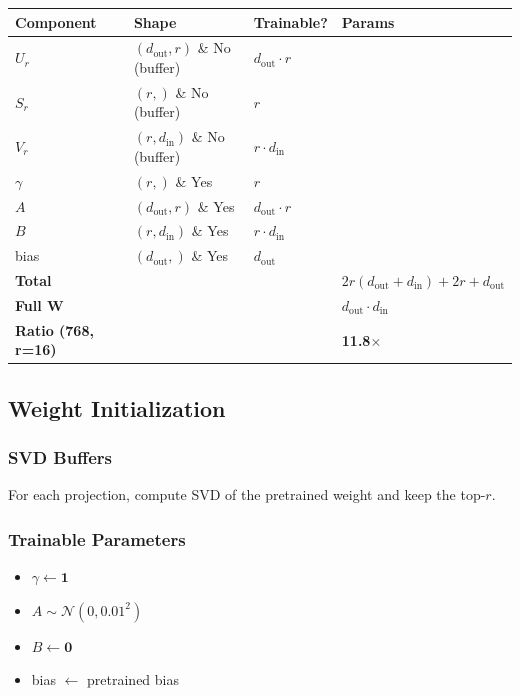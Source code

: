 \begin{table}[H]
\centering
\small
\begin{tabular}{llll}
\toprule
\textbf{Component} & \textbf{Shape} & \textbf{Trainable?} & \textbf{Params} \\
\midrule
$U_r$ & $(d_\text{out}, r)$ \& No (buffer) & $d_\text{out} \cdot r$ \\
$S_r$ & $(r,)$ \& No (buffer) & $r$ \\
$V_r$ & $(r, d_\text{in})$ \& No (buffer) & $r \cdot d_\text{in}$ \\
$\gamma$ & $(r,)$ \& Yes & $r$ \\
$A$ & $(d_\text{out}, r)$ \& Yes & $d_\text{out} \cdot r$ \\
$B$ & $(r, d_\text{in})$ \& Yes & $r \cdot d_\text{in}$ \\
bias & $(d_\text{out},)$ \& Yes & $d_\text{out}$ \\
\textbf{Total} &  &  & $2r(d_\text{out} + d_\text{in}) + 2r + d_\text{out}$ \\
\textbf{Full W} &  &  & $d_\text{out} \cdot d_\text{in}$ \\
\textbf{Ratio (768, r=16)} &  &  & \textbf{11.8$\times$} \\
\bottomrule
\end{tabular}
\end{table}

\subsection{Weight Initialization}

\subsubsection{SVD Buffers}

For each projection, compute SVD of the pretrained weight and keep the 
top-$r$.

\subsubsection{Trainable Parameters}

\begin{itemize}
\item $\gamma \leftarrow \mathbf{1}$
\item $A \sim \mathcal{N}(0, 0.01^2)$
\item $B \leftarrow \mathbf{0}$
\item bias $\leftarrow$ pretrained bias

\end{itemize}
